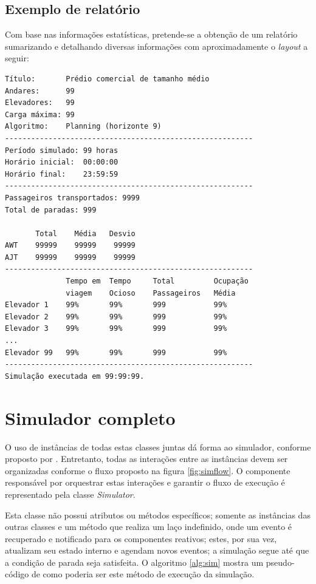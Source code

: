 \subsection{Exemplo de relatório}
Com base nas informações estatísticas, pretende-se a obtenção de um relatório
sumarizando e detalhando diversas informações com aproximadamente o
\textit{layout} a seguir:

\begin{lstlisting}
Título:       Prédio comercial de tamanho médio
Andares:      99
Elevadores:   99
Carga máxima: 99
Algoritmo:    Planning (horizonte 9)
---------------------------------------------------------
Período simulado: 99 horas
Horário inicial:  00:00:00
Horário final:    23:59:59
---------------------------------------------------------
Passageiros transportados: 9999
Total de paradas: 999

       Total    Média   Desvio
AWT    99999    99999    99999
AJT    99999    99999    99999
---------------------------------------------------------
              Tempo em  Tempo     Total         Ocupação
              viagem    Ocioso    Passageiros   Média
Elevador 1    99%       99%       999           99%
Elevador 2    99%       99%       999           99%
Elevador 3    99%       99%       999           99%
...
Elevador 99   99%       99%       999           99%
---------------------------------------------------------
Simulação executada em 99:99:99.
\end{lstlisting}

\section{Simulador completo}

O uso de instâncias de todas estas classes juntas dá forma ao simulador,
conforme proposto por \cite{Law,Banks}. Entretanto, todas as interações entre as
instâncias devem ser organizadas conforme o fluxo proposto na figura
\ref{fig:simflow}. O componente responsável por orquestrar estas interações e
garantir o fluxo de execução é representado pela classe \textit{Simulator}.

Esta classe não possui atributos ou métodos específicos; somente as instâncias
das outras classes e um método que realiza um laço indefinido, onde um evento é
recuperado e notificado para os componentes reativos; estes, por sua vez,
atualizam seu estado interno e agendam novos eventos; a simulação segue até que
a condição de parada seja satisfeita. O algoritmo \ref{alg:sim} mostra um
pseudo-código de como poderia ser este método de execução da simulação.


